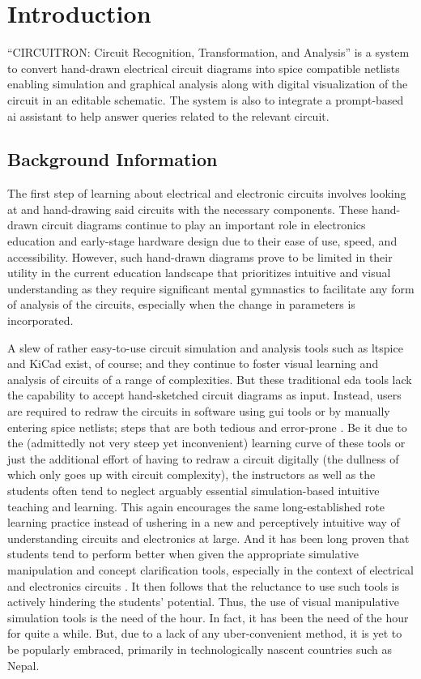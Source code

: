 \chapter{Introduction}

\noindent ``CIRCUITRON: Circuit Recognition, Transformation, and Analysis'' is a system to convert hand-drawn electrical circuit diagrams into \gls{spice} compatible netlists enabling simulation and graphical analysis along with digital visualization of the circuit in an editable schematic. The system is also to integrate a prompt-based \gls{ai} assistant to help answer queries related to the relevant circuit.

\section{Background Information}

The first step of learning about electrical and electronic circuits involves looking at and hand-drawing said circuits with the necessary components. These hand-drawn circuit diagrams continue to play an important role in electronics education and early-stage hardware design due to their ease of use, speed, and accessibility. However, such hand-drawn diagrams prove to be limited in their utility in the current education landscape that prioritizes intuitive and visual understanding as they require significant mental gymnastics to facilitate any form of analysis of the circuits, especially when the change in parameters is incorporated.

A slew of rather easy-to-use circuit simulation and analysis tools such as \gls{ltspice} and KiCad exist, of course; and they continue to foster visual learning and analysis of circuits of a range of complexities. But these traditional \gls{eda} tools lack the capability to accept hand-sketched circuit diagrams as input. Instead, users are required to redraw the circuits in software using \gls{gui} tools or by manually entering \gls{spice} netlists; steps that are both tedious and error-prone \cite{reddy2021handdrawn, sertdemir2022img2sim}. Be it due to the (admittedly not very steep yet inconvenient) learning curve of these tools or just the additional effort of having to redraw a circuit digitally (the dullness of which only goes up with circuit complexity), the instructors as well as the students often tend to neglect arguably essential simulation-based intuitive teaching and learning. This again encourages the same long-established rote learning practice instead of ushering in a new and perceptively intuitive way of understanding circuits and electronics at large. And it has been long proven that students tend to perform better when given the appropriate simulative manipulation and concept clarification tools, especially in the context of electrical and electronics circuits \cite{chen2011efficacy}. It then follows that the reluctance to use such tools is actively hindering the students' potential. Thus, the use of visual manipulative simulation tools is the need of the hour. In fact, it has been the need of the hour for quite a while. But, due to a lack of any uber-convenient method, it is yet to be popularly embraced, primarily in technologically nascent countries such as Nepal.

